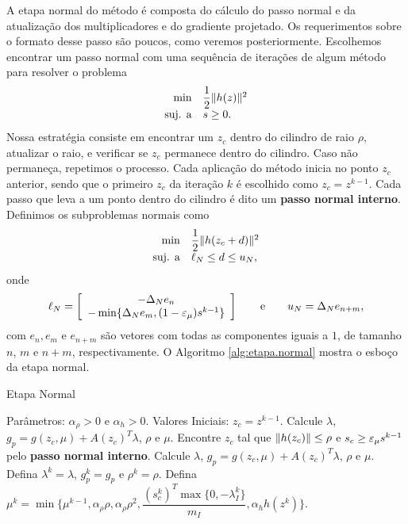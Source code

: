 A etapa normal do método é composta do cálculo do passo normal e da atualização
dos multiplicadores e do gradiente projetado. 
Os requerimentos sobre o formato desse passo s\~ao poucos, como veremos
posteriormente. Escolhemos encontrar um passo normal com uma sequ\^encia de
itera\c{c}\~oes de algum m\'etodo para resolver o problema 
\begin{equation}\visiblelbl{prob:normal}
\begin{array}{rl}
  \min &\dfrac{1}{2}\norma{h(z)}^2 \\
  \mbox{suj. a} & s \geq 0.
\end{array}
\end{equation}
Nossa estrat\'egia consiste em encontrar um $z_c$ dentro do cilindro de raio 
$\rho$, atualizar o raio, e verificar se $z_c$ permanece dentro do cilindro.
Caso n\~ao permane\c{c}a, repetimos o processo. Cada aplica\c{c}\~ao do m\'etodo
inicia no ponto $z_c$ anterior, sendo que o primeiro $z_c$ da iteração $k$ é
escolhido como $z_c = z^{k-1}$. 
Cada passo que leva a um ponto dentro do cilindro é dito um {\bf passo normal
interno}.
Definimos os subproblemas normais como
\begin{equation}\visiblelbl{prob:normal_direction}
\begin{array}{rl}
  \min & \dfrac{1}{2}\norma{h(z_c+d)}^2 \\
 \mbox{suj. a} & \ell_N \leq d \leq u_N,
\end{array}
\end{equation}
onde 
\begin{equation}\visiblelbl{eq:normal_bounds_definition}
  \ell_N = \vetor{-\Delta_Ne_n}{-\min\{\Delta_Ne_m,(1-\epsmu)s^{k-1}\}}
  \qquad\mbox{e}\qquad u_N = \Delta_Ne_{n+m},
\end{equation}
com $e_n, e_m$ e $e_{n+m}$ são vetores com todas as componentes iguais a $1$, de
tamanho $n$, $m$ e $n+m$, respectivamente.
O Algoritmo \ref{alg:etapa.normal} mostra o esboço da etapa normal.
\begin{algorithm}[H]
\caption{Etapa Normal}
\begin{algorithmic}[1]
\State Parâmetros: $\alpha_\rho > 0$ e $\alpha_h > 0$.
\State Valores Iniciais: $z_c = z^{k-1}$.
\State Calcule $\lambda$, $g_p = g(z_c,\mu) + A(z_c)^T\lambda$, $\rho$ e
  $\mu$.
  \State Encontre $z_c$ tal que $\Vert h(z_c)\Vert \leq \rho$ e $s_c \geq \varepsilon_{\mu}
    s^{k-1}$ pelo {\bf passo normal interno}.
  \State Calcule $\lambda$, $g_p = g(z_c,\mu) + A(z_c)^T\lambda$, $\rho$ e
    $\mu$.
\EndWhile
\State Defina $\lambda^k = \lambda$, $g_p^k = g_p$ e $\rho^k = \rho$.
\State Defina $\mu^k = \min\bigg\{ \mu^{k-1}, \alpha_\rho\rho,
  \alpha_\rho\rho^2, \dfrac{(s_c^k)^T\max\{0,-\lambda_I^k\}}{m_I},
  \alpha_hh(z^k)\bigg\}.$
\end{algorithmic}
\end{algorithm}
